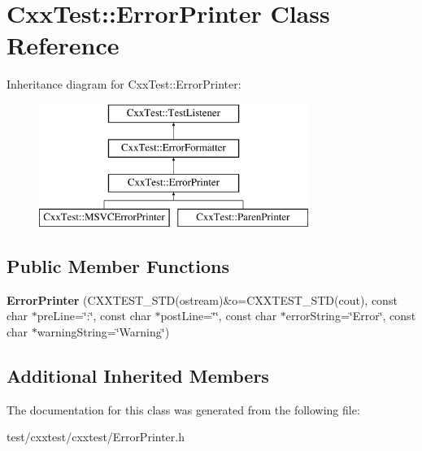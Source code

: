 \hypertarget{classCxxTest_1_1ErrorPrinter}{\section{Cxx\-Test\-:\-:Error\-Printer Class Reference}
\label{classCxxTest_1_1ErrorPrinter}
}
Inheritance diagram for Cxx\-Test\-:\-:Error\-Printer\-:\begin{figure}[H]
\begin{center}
\leavevmode
\includegraphics[height=4.000000cm]{classCxxTest_1_1ErrorPrinter}
\end{center}
\end{figure}
\subsection*{Public Member Functions}
\begin{DoxyCompactItemize}
\item 
\hypertarget{classCxxTest_1_1ErrorPrinter_ab51bf2abfd3365f1d120f4c32ff3d8ad}{{\bfseries Error\-Printer} (C\-X\-X\-T\-E\-S\-T\-\_\-\-S\-T\-D(ostream)\&o=C\-X\-X\-T\-E\-S\-T\-\_\-\-S\-T\-D(cout), const char $\ast$pre\-Line=\char`\"{}\-:\char`\"{}, const char $\ast$post\-Line=\char`\"{}\char`\"{}, const char $\ast$error\-String=\char`\"{}Error\char`\"{}, const char $\ast$warning\-String=\char`\"{}Warning\char`\"{})}\label{classCxxTest_1_1ErrorPrinter_ab51bf2abfd3365f1d120f4c32ff3d8ad}

\end{DoxyCompactItemize}
\subsection*{Additional Inherited Members}


The documentation for this class was generated from the following file\-:\begin{DoxyCompactItemize}
\item 
test/cxxtest/cxxtest/Error\-Printer.\-h\end{DoxyCompactItemize}
